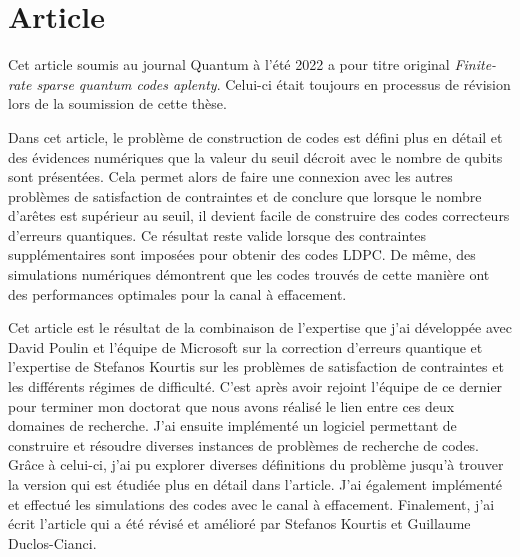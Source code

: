 \section{Article}

Cet article soumis au journal Quantum à l'été 2022 a pour titre original
\textit{Finite-rate sparse quantum codes aplenty}.
Celui-ci était toujours en processus de révision lors de la soumission de cette thèse.

Dans cet article, le problème de construction de codes est défini plus en détail
et des évidences numériques que la valeur du seuil décroit avec le nombre de qubits sont présentées.
Cela permet alors de faire une connexion avec les autres problèmes de satisfaction de contraintes
et de conclure que lorsque le nombre d'arêtes est supérieur au seuil,
il devient facile de construire des codes correcteurs d'erreurs quantiques.
Ce résultat reste valide lorsque des contraintes supplémentaires sont imposées pour obtenir des codes LDPC.
De même,
des simulations numériques démontrent que les codes trouvés de cette manière
ont des performances optimales pour la canal à effacement.

Cet article est le résultat de la combinaison de l'expertise que j'ai développée avec David Poulin
et l'équipe de Microsoft sur la correction d'erreurs quantique et l'expertise de Stefanos Kourtis
sur les problèmes de satisfaction de contraintes et les différents régimes de difficulté.
C'est après avoir rejoint l'équipe de ce dernier pour terminer mon doctorat que nous avons 
réalisé le lien entre ces deux domaines de recherche.
J'ai ensuite implémenté un logiciel permettant de construire et résoudre diverses instances 
de problèmes de recherche de codes.
Grâce à celui-ci,
j'ai pu explorer diverses définitions du problème jusqu'à trouver la version qui est étudiée plus
en détail dans l'article.
J'ai également implémenté et effectué les simulations des codes avec le canal à effacement.
Finalement, 
j'ai écrit l'article qui a été révisé et amélioré par Stefanos Kourtis et Guillaume Duclos-Cianci.


